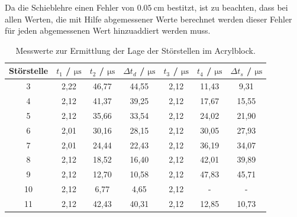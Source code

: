 \noindent Da die Schieblehre einen Fehler von $\SI{0,05}{\cm}$ bestitzt, ist zu beachten, dass bei allen Werten, die mit Hilfe abgemessener Werte berechnet
werden dieser Fehler für jeden abgemessenen Wert hinzuaddiert werden muss.
\FloatBarrier
\begin{table}
  \centering
  \caption{Messwerte zur Ermittlung der Lage der Störstellen im Acrylblock.}
  \label{tab1}
  \begin{tabular}{c c c c c c c }
    \toprule
      Störstelle & $t_1$ / $\si{\micro \second}$ & $t_2$ / $\si{\micro \second}$ & $\Delta t_d$ / $\si{\micro \second}$ &  $t_3$ / $\si{\micro \second}$ & $t_4$ / $\si{\micro \second}$ & $\Delta t_s$ / $\si{\micro \second}$ \\
              \midrule
              3  &  2,22  &  46,77  &  44,55   &  2,12  &  11,43  &  9,31    \\
              4  &  2,12  &  41,37  &  39,25   &  2,12  &  17,67  & 15,55    \\
              5  &  2,12  &  35,66  &  33,54   &  2,12  &  24,02  & 21,90    \\
              6  &  2,01  &  30,16  &  28,15   &  2,12  &  30,05  & 27,93    \\
              7  &  2,01  &  24,44  &  22,43   &  2,12  &  36,19  & 34,07    \\
              8  &  2,12  &  18,52  &  16,40   &  2,12  &  42,01  & 39,89    \\
              9  &  2,12  &  12,70  &  10,58   &  2,12  &  47,83  & 45,71    \\
              10 &  2,12  &   6,77  &   4,65   &  2,12  &  -      & -        \\
              11 &  2,12  &  42,43  &  40,31   &  2,12  &  12,85  & 10,73    \\
              \bottomrule
            \end{tabular}
\end{table}
\FloatBarrier
